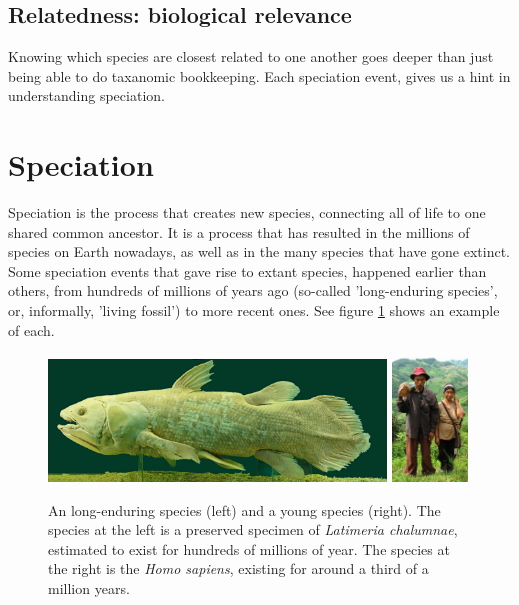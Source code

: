 \subsection{Relatedness: biological relevance}

Knowing which species are closest related to
one another goes deeper than just
being able to do taxanomic bookkeeping. Each
speciation event, gives us a hint in understanding speciation.

\section{Speciation}
 
Speciation is the process that creates new species,
connecting all of life to one shared common ancestor. It is a process
that has resulted in the millions of species on Earth nowadays, 
as well as in the many species that have gone extinct.
Some speciation events that gave rise to extant species, 
happened earlier than others,
from hundreds of millions of years ago (so-called 'long-enduring species',
or, informally, 'living fossil') 
to more recent ones. See figure \ref{fig:long_enduring_and_young_species} 
shows an example of each.

\begin{figure}[H]
  \includegraphics[width=0.80\textwidth]{latimeria_chalumnae.jpg}
  \includegraphics[width=0.18\textwidth]{homo_sapiens.jpg}
  \caption{
    An long-enduring species (left) and a young species (right).
    The species at the left is a preserved specimen of \textit{Latimeria chalumnae}, 
    estimated to exist for hundreds of millions of year.
    The species at the right is the \textit{Homo sapiens}, 
    existing for around a third of a million years.
  }
  \label{fig:long_enduring_and_young_species}
\end{figure}

